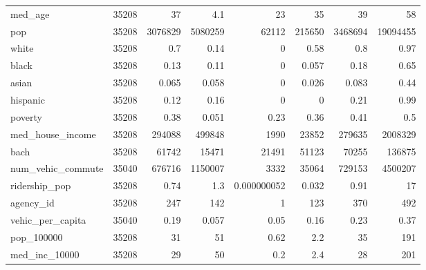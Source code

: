 \begin{table}[!htbp]
{\begin{tabular}{lrrrrrrr}
med\_age & 35208 & 37 & 4.1 & 23 & 35 & 39 & 58 \\ 
pop & 35208 & 3076829 & 5080259 & 62112 & 215650 & 3468694 & 19094455 \\ 
white & 35208 & 0.7 & 0.14 & 0 & 0.58 & 0.8 & 0.97 \\ 
black & 35208 & 0.13 & 0.11 & 0 & 0.057 & 0.18 & 0.65 \\ 
asian & 35208 & 0.065 & 0.058 & 0 & 0.026 & 0.083 & 0.44 \\ 
hispanic & 35208 & 0.12 & 0.16 & 0 & 0 & 0.21 & 0.99 \\ 
poverty & 35208 & 0.38 & 0.051 & 0.23 & 0.36 & 0.41 & 0.5 \\ 
med\_house\_income & 35208 & 294088 & 499848 & 1990 & 23852 & 279635 & 2008329 \\ 
bach & 35208 & 61742 & 15471 & 21491 & 51123 & 70255 & 136875 \\ 
num\_vehic\_commute & 35040 & 676716 & 1150007 & 3332 & 35064 & 729153 & 4500207 \\ 
ridership\_pop & 35208 & 0.74 & 1.3 & 0.000000052 & 0.032 & 0.91 & 17 \\ 
agency\_id & 35208 & 247 & 142 & 1 & 123 & 370 & 492 \\ 
vehic\_per\_capita & 35040 & 0.19 & 0.057 & 0.05 & 0.16 & 0.23 & 0.37 \\ 
pop\_100000 & 35208 & 31 & 51 & 0.62 & 2.2 & 35 & 191 \\ 
med\_inc\_10000 & 35208 & 29 & 50 & 0.2 & 2.4 & 28 & 201\\ 
\hline
\hline
\end{tabular}
}
\end{table}

